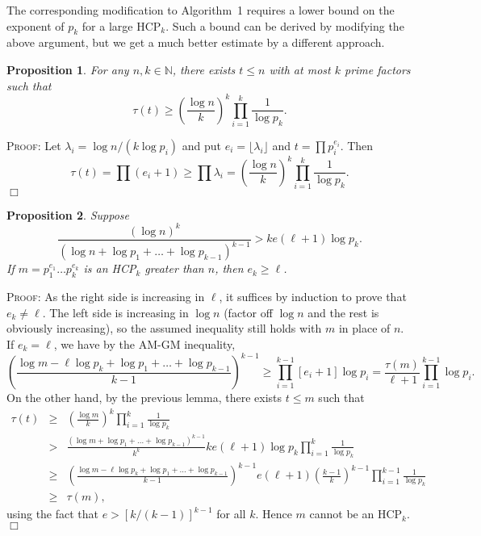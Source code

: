 \documentclass[12pt]{article}
\def\NN{\mathbb{N}}
\newtheorem{lemma}{Proposition}
\newenvironment{proof}{\textsc{Proof:}}{$\Box$ \medskip}
\begin{document}
The corresponding modification to Algorithm~1 requires
a lower bound on the exponent of $p_{k}$ for a large HCP$_{k}$. Such 
a bound can be derived by modifying the above argument, but we get a much 
better estimate by a different approach.
\begin{lemma}
For any $n, k \in \NN$, there exists $t \leq n$ with at most $k$ 
prime factors such that
\[
\tau(t) \geq \left( \frac{\log n}{k} \right)^{k} \prod_{i=1}^{k} 
\frac{1}{\log p_{k}}.
\]
\end{lemma}
\begin{proof}
Let $\lambda_{i} = \log n/(k \log p_{i})$ and put $e_{i} = \lfloor 
\lambda_{i} \rfloor$ and $t = \prod p_{i}^{e_{i}}$. Then
\[
\tau(t) = \prod (e_{i} + 1) \geq \prod \lambda_{i} =
\left( \frac{\log n}{k} \right)^{k} \prod_{i=1}^{k}\frac{1}{\log p_{k}}.
\]
\end{proof}
\begin{lemma}
Suppose
\[
\frac{(\log n)^{k}}
{(\log n + \log p_{1} + \dots + \log p_{k-1})^{k-1}}
> ke(\ell + 1) \log p_{k}.
\]
If $m = p_{1}^{e_{1}} \dots p_{k}^{e_{k}}$ is an HCP$_{k}$ greater than 
$n$, then $e_{k} \geq \ell$.
\end{lemma}
\begin{proof}
As the right side is increasing in $\ell$, it suffices by induction to
prove that $e_k \neq \ell$. The left side 
is increasing in $\log n$ (factor off $\log n$ and the rest is 
obviously increasing), so the 
assumed inequality still holds with $m$ in place of $n$. If $e_k =
\ell$, we have by the AM-GM inequality,
\[
\left( \frac{\log m - \ell \log p_{k} + \log p_{1} + \dots + \log p_{k-1}}{k-1}
\right) 
^{k-1} \geq \prod_{i=1}^{k-1} [e_{i} + 1]\log p_{i} = 
\frac{\tau(m)}{\ell+1} \prod_{i=1}^{k-1} \log p_{i}.
\]
On the other hand, by the previous lemma, there exists $t \leq m$ such 
that
\begin{eqnarray*}
\tau(t) &\geq& \left( \frac{\log m}{k} \right)^{k} \prod_{i=1}^{k} 
\frac{1}{\log p_{k}} \\
&>& \frac{(\log m + \log p_{1} + \dots +
\log p_{k-1})^{k-1}}{k^{k}} 
k e (\ell +1) \log p_{k} \prod_{i=1}^{k} 
\frac{1}{\log p_{k}} \\
&\geq& \left( \frac{\log m - \ell \log p_{k}+ \log p_{1} + \dots +
\log p_{k-1}}{k-1} \right)^{k-1}
e (\ell+1) \left( \frac{k-1}{k} \right)^{k-1} \prod_{i=1}^{k-1} 
\frac{1}{\log p_{k}} \\
&\geq& \tau(m),
\end{eqnarray*}
using the fact that $e > [k/(k-1)]^{k-1}$ for all $k$. Hence $m$ 
cannot be an HCP$_{k}$.
\end{proof}
\end{document}
